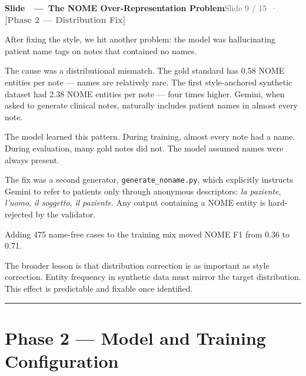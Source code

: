 \documentclass[11pt,a4paper]{article}
\newcommand{\phaselabel}[2]{\textbf{\textcolor{#1}{[#2]}}}
\newcounter{slidectr}
\newcommand{\slidescript}[3]{%
  \stepcounter{slidectr}
  \begin{slidebox}
    \noindent\textbf{Slide \theslidectr\ \,—\, #1}\hfill\small\textcolor{dimgray}{#2}
  \end{slidebox}
  \vspace{0.4em}
  #3
  \vspace{1.2em}
  \noindent\textcolor{dimgray!60}{\rule{\linewidth}{0.4pt}}
  \vspace{0.6em}
}
\begin{document}
\slidescript{The NOME Over-Representation Problem}{Slide 9 / 15 \,·\, \phaselabel{phase2}{Phase 2 — Distribution Fix}}{

After fixing the style, we hit another problem: the model was hallucinating patient name tags on notes that contained no names.

The cause was a distributional mismatch. The gold standard has 0.58 NOME entities per note — names are relatively rare. The first style-anchored synthetic dataset had 2.38 NOME entities per note — four times higher. Gemini, when asked to generate clinical notes, naturally includes patient names in almost every note.

The model learned this pattern. During training, almost every note had a name. During evaluation, many gold notes did not. The model assumed names were always present.

The fix was a second generator, \texttt{generate\_noname.py}, which explicitly instructs Gemini to refer to patients only through anonymous descriptors: \emph{la paziente}, \emph{l'uomo}, \emph{il soggetto}, \emph{il paziente}. Any output containing a NOME entity is hard-rejected by the validator.

Adding 475 name-free cases to the training mix moved NOME F1 from 0.36 to 0.71.

The broader lesson is that distribution correction is as important as style correction. Entity frequency in synthetic data must mirror the target distribution. This effect is predictable and fixable once identified.

}

\section{Phase 2 --- Model and Training Configuration}
\end{document}
